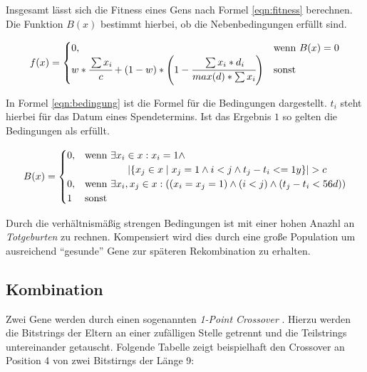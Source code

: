 Insgesamt lässt sich die Fitness eines Gens nach Formel \ref{eqn:fitness} berechnen.
Die Funktion $B(x)$ bestimmt hierbei, ob die Nebenbedingungen erfüllt sind.

\begin{equation}
    \label{eqn:fitness}
    f(x)=
    \begin{cases}
        0,              & \text{wenn } B(x) = 0 \\
        w * \cfrac{\sum x_i}{c} + (1 - w) * \left(1 - \cfrac{\sum x_i * d_i}{max(d) * \sum x_i}\right) & \text{sonst}
    \end{cases}
\end{equation}

In Formel \ref{eqn:bedingung} ist die Formel für die Bedingungen dargestellt.
$t_i$ steht hierbei für das Datum eines Spendetermins.
Ist das Ergebnis $1$ so gelten die Bedingungen als erfüllt.



\begin{multline}
    \label{eqn:bedingung}
    B(x)=
    \begin{cases}
        0, & \text{wenn } \exists x_i \in x : x_i = 1  \wedge \\
           & \hspace{10ex} \lvert \{ x_j\in x \mid x_j = 1 \wedge i < j \wedge t_j - t_i <= 1y  \} \rvert > c   \\
        0, & \text{wenn } \exists x_i, x_j \in x : \left( (x_i = x_j = 1) \wedge (i < j) \wedge (t_j - t_i < 56d) \right)    \\
        1  & \text{sonst}
    \end{cases}
\end{multline}

Durch die verhältnismäßig strengen Bedingungen ist mit einer hohen Anazhl an \emph{Totgeburten} zu rechnen.
Kompensiert wird dies durch eine große Population um ausreichend \enquote{gesunde} Gene zur späteren Rekombination zu erhalten.




\subsection{Kombination}\label{sec:evol-alg-kombi}
Zwei Gene werden durch einen sogenannten \emph{1-Point Crossover} \cite{AJ2015}.
Hierzu werden die Bitstrings der Eltern an einer zufälligen Stelle getrennt und die Teilstrings untereinander getauscht.
Folgende Tabelle zeigt beispielhaft den Crossover an Position 4 von zwei Bitstirngs der Länge 9:

